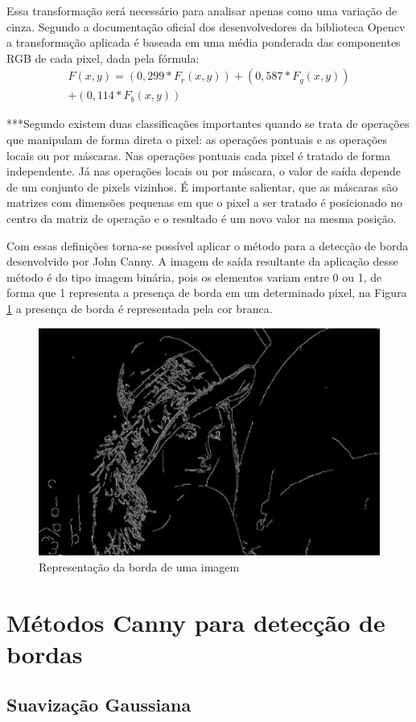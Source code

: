 \documentclass[a4paper,alpha-refs]{RBCA_v1.0}
\begin{document}
Essa transformação será necessário para analisar apenas como uma variação de cinza. Segundo a documentação oficial dos desenvolvedores da biblioteca Opencv a transformação aplicada é baseada em uma média ponderada das componentes RGB de cada pixel, dada pela fórmula:
\begin{eqnarray*}
F(x,y)=(0,299*F_r(x,y))+(0,587*F_g(x,y)) \\ +(0,114*F_b(x,y))
\end{eqnarray*} 

***Segundo \cite{de2006introduccao} existem duas classificações importantes quando se trata de operações que manipulam de forma direta o pixel: as operações pontuais e as operações locais ou por máscaras. Nas operações pontuais cada pixel é tratado de forma independente. Já nas operações locais ou por máscara, o valor de saída depende de um conjunto de pixels vizinhos. É importante salientar, que as máscaras são matrizes com dimensões pequenas em que o pixel a ser tratado é posicionado no centro da matriz de operação e o resultado é um novo valor na mesma posição.

Com essas definições torna-se possível aplicar o método para a detecção de borda desenvolvido por John Canny. A imagem de saída resultante da aplicação desse método é do tipo imagem binária, pois os elementos variam entre 0 ou 1, de forma que 1 representa a presença de borda em um determinado pixel, na Figura \ref{img:lenaborda} a presença de borda é representada pela cor branca. 

\begin{figure}[h!]
	\centering
	\includegraphics[width=.3\textwidth]{img/img9.jpg}
	\caption{Representação da borda de uma imagem}
	\label{img:lenaborda}
\end{figure}

\section{Métodos Canny para detecção de bordas}
\subsection{Suavização Gaussiana}
\end{document}
